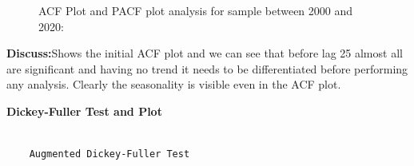 \documentclass[12pt,a4paper]{book}
\begin{document}
{\begin{figure}
\begin{minipage}[t]{0.50\linewidth}
{{}

}

\end{minipage}%
%
\begin{minipage}[t]{0.50\linewidth}

{\centering 


}

\end{minipage}%

\caption{\label{fig-ACF}ACF Plot and PACF plot analysis for sample
between 2000 and 2020:}

\end{figure}

\textbf{Discuss:}Shows the initial ACF plot and we can see that before
lag 25 almost all are significant and having no trend it needs to be
differentiated before performing any analysis. Clearly the seasonality
is visible even in the ACF plot.

\textbf{Dickey-Fuller Test and Plot}

\begin{Shaded}
\begin{Highlighting}[]
\SpecialCharTok{::}
\end{Highlighting}
\end{Shaded}

\begin{verbatim}

    Augmented Dickey-Fuller Test


\end{verbatim}}
\end{document}
